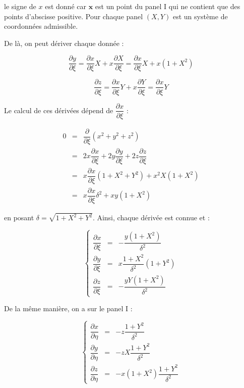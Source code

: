 le signe de $x$ est donné car $\mathbf{x}$ est un point du panel I qui ne contient que des points d'abscisse positive. Pour chaque panel $(X,Y)$ est un système de coordonnées admissible.

De là, on peut dériver chaque donnée :

\begin{equation}
\dfrac{\partial y}{\partial \xi} = \dfrac{\partial x}{\partial \xi} X + x \dfrac{\partial X}{\partial \xi} = \dfrac{\partial x}{\partial \xi} X + x(1+X^2)
\end{equation}

\begin{equation}
\dfrac{\partial z}{\partial \xi} = \dfrac{\partial x}{\partial \xi} Y + x \dfrac{\partial Y}{\partial \xi} = \dfrac{\partial x}{\partial \xi} Y
\end{equation}

Le calcul de ces dérivées dépend de $\dfrac{\partial x}{\partial \xi}$ :

\begin{equation*}
\begin{array}{rcl}
0 & = & \dfrac{\partial}{\partial \xi} ( x^2+y^2+z^2) \\
  & = & 2x\dfrac{\partial x}{\partial \xi} + 2y\dfrac{\partial y}{\partial \xi}+ 2z\dfrac{\partial z}{\partial \xi} \\
  & = & x \dfrac{\partial x}{\partial \xi} ( 1 +X^2 + Y^2) + x^2 X (1+X^2)\\
  & = & x \dfrac{\partial x}{\partial \xi} \delta^2 + xy (1+X^2)
\end{array}
\end{equation*}

en posant $\delta = \sqrt{1+X^2+Y^2}$. Ainsi, chaque dérivée est connue et :

\begin{equation}
\left\lbrace
\begin{array}{rcl}
\dfrac{\partial x}{\partial \xi} & = & -\dfrac{y(1+X^2)}{\delta^2}\\
\dfrac{\partial y}{\partial \xi} & = & x \dfrac{1+X^2}{\delta^2} (1+Y^2)\\
\dfrac{\partial z}{\partial \xi} & = & - \dfrac{yY(1+X^2)}{\delta^2}
\end{array}
\right.
\end{equation}

De la même manière, on a sur le panel I :

\begin{equation}
\left\lbrace
\begin{array}{rcl}
\dfrac{\partial x}{\partial \eta} & = & - z\dfrac{1+Y^2}{\delta^2}\\
\dfrac{\partial y}{\partial \eta} & = & - zX\dfrac{1+Y^2}{\delta^2}\\
\dfrac{\partial z}{\partial \eta} & = & - x(1+X^2) \dfrac{1+Y^2}{\delta^2}
\end{array}
\right.
\end{equation}


